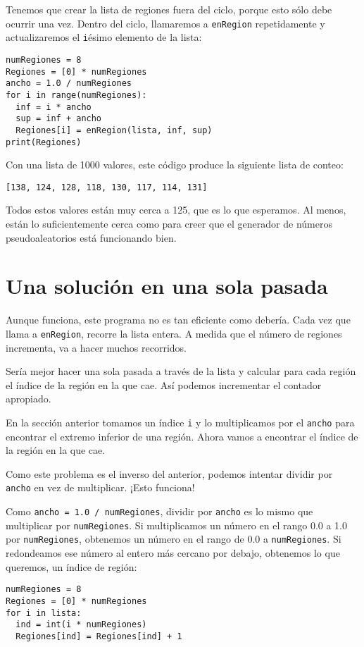 Tenemos que crear la lista de regiones fuera del ciclo, porque esto
sólo debe ocurrir una vez. Dentro del ciclo, llamaremos a \texttt{enRegion}
repetidamente y actualizaremos el \texttt{i}ésimo elemento de la lista:
\begin{lstlisting}
numRegiones = 8
Regiones = [0] * numRegiones
ancho = 1.0 / numRegiones
for i in range(numRegiones):
  inf = i * ancho
  sup = inf + ancho
  Regiones[i] = enRegion(lista, inf, sup)
print(Regiones)
\end{lstlisting}

Con una lista de 1000 valores, este código produce la siguiente lista
de conteo:
\begin{verbatim}
[138, 124, 128, 118, 130, 117, 114, 131]
\end{verbatim}
Todos estos valores están muy cerca a 125, que es lo que esperamos.
Al menos, están lo suficientemente cerca como para creer que el generador
de números pseudoaleatorios está funcionando bien.

\section{Una solución en una sola pasada}

\label{histograma} 

Aunque funciona, este programa no es tan eficiente como debería. Cada
vez que llama a \texttt{enRegion}, recorre la lista entera. A medida
que el número de regiones incrementa, va a hacer muchos recorridos.

Sería mejor hacer una sola pasada a través de la lista y calcular
para cada región el índice de la región en la que cae. Así podemos
incrementar el contador apropiado.

En la sección anterior tomamos un índice \texttt{i} y lo multiplicamos
por el \texttt{ancho} para encontrar el extremo inferior de una región.
Ahora vamos a encontrar el índice de la región en la que cae.

Como este problema es el inverso del anterior, podemos intentar dividir
por \texttt{ancho} en vez de multiplicar. ¡Esto funciona!

Como \texttt{ancho = 1.0 / numRegiones}, dividir por \texttt{ancho}
es lo mismo que multiplicar por \texttt{numRegiones}. Si multiplicamos
un número en el rango 0.0 a 1.0 por \texttt{numRegiones}, obtenemos
un número en el rango de 0.0 a \texttt{numRegiones}. Si redondeamos
ese número al entero más cercano por debajo, obtenemos lo que queremos,
un índice de región:
\begin{lstlisting}
numRegiones = 8
Regiones = [0] * numRegiones
for i in lista:
  ind = int(i * numRegiones)
  Regiones[ind] = Regiones[ind] + 1
\end{lstlisting}

